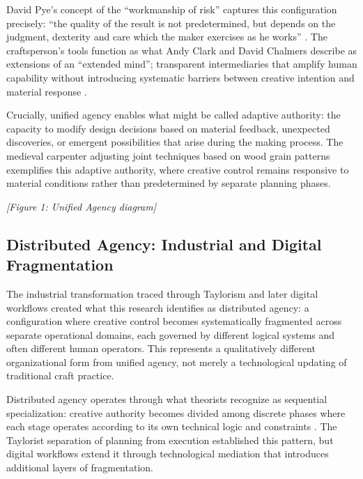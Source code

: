 \vspace{0.5cm}

David Pye's concept of the ``workmanship of risk'' captures this configuration precisely: ``the quality of the result is not predetermined, but depends on the judgment, dexterity and care which the maker exercises as he works'' \citep{pye1971}. The craftsperson's tools function as what Andy Clark and David Chalmers describe as extensions of an ``extended mind''; transparent intermediaries that amplify human capability without introducing systematic barriers between creative intention and material response \citep{clark1998}.

\vspace{0.5cm}

Crucially, unified agency enables what might be called adaptive authority: the capacity to modify design decisions based on material feedback, unexpected discoveries, or emergent possibilities that arise during the making process. The medieval carpenter adjusting joint techniques based on wood grain patterns exemplifies this adaptive authority, where creative control remains responsive to material conditions rather than predetermined by separate planning phases.

\vspace{0.5cm}

\textit{[Figure 1: Unified Agency diagram]}

\subsection{Distributed Agency: Industrial and Digital Fragmentation}

The industrial transformation traced through Taylorism and later digital workflows created what this research identifies as distributed agency: a configuration where creative control becomes systematically fragmented across separate operational domains, each governed by different logical systems and often different human operators. This represents a qualitatively different organizational form from unified agency, not merely a technological updating of traditional craft practice.

\vspace{0.5cm}

Distributed agency operates through what theorists recognize as sequential specialization: creative authority becomes divided among discrete phases where each stage operates according to its own technical logic and constraints \citep{enfield2017}. The Taylorist separation of planning from execution established this pattern, but digital workflows extend it through technological mediation that introduces additional layers of fragmentation.


